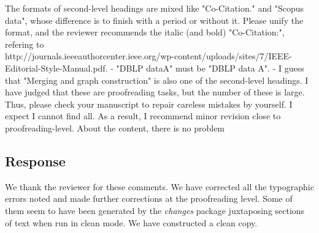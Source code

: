 \documentclass[11pt, oneside]{article}   	%
\begin{document}
The formats of second-level headings are mixed like "Co-Citation." and "Scopus data", whose difference is to finish with a period or without it. Please unify the format, and the reviewer recommends 
the italic (and bold) "Co-Citation:", refering to\\ http://journals.ieeeauthorcenter.ieee.org/wp-content/uploads/sites/7/IEEE-Editorial-Style-Manual.pdf.
- "DBLP dataA" must be "DBLP data A".
- I guess that "Merging and graph construction" is also one of the second-level headings.
I have judged that these are proofreading tasks, but the number of these is large. Thus, please check your manuscript to repair careless mistakes by yourself. I expect I cannot find all.
As a result, I recommend minor revision close to proofreading-level. About the content, there is no problem

\subsection*{Response}

We thank the reviewer for these comments. We have corrected all the typographic errors noted and made further corrections at the proofreading level. Some of them seem to have been generated by 
the \emph{changes} package juxtaposing sections of text when run in clean mode. We have constructed a clean copy.

    
\end{document}
